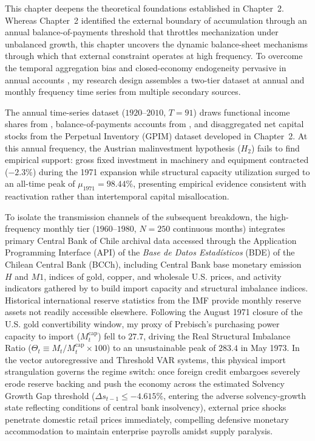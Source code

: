 This chapter deepens the theoretical foundations established in Chapter~2. Whereas Chapter~2 identified the external boundary of accumulation through an annual balance-of-payments threshold that throttles mechanization under unbalanced growth, this chapter uncovers the dynamic balance-sheet mechanisms through which that external constraint operates at high frequency. To overcome the temporal aggregation bias and closed-economy endogeneity pervasive in annual accounts \citep{DornbuschEdwards1990,Edwards2024}, my research design assembles a two-tier dataset at annual and monthly frequency time series from multiple secondary sources.  

The annual time-series dataset ($1920$--$2010$, $T=91$) draws functional income shares from \citet{Astorga2023}, balance-of-payments accounts from \citet{NievasPiketty2025}, and disaggregated net capital stocks from the Perpetual Inventory (GPIM) dataset developed in Chapter~2. At this annual frequency, the Austrian malinvestment hypothesis ($H_2$) fails to find empirical support: gross fixed investment in machinery and equipment contracted ($-2.3\%$) during the 1971 expansion while structural capacity utilization surged to an all-time peak of $\mu_{1971} = 98.44\%$, presenting empirical evidence consistent with reactivation rather than intertemporal capital misallocation. 

To isolate the transmission channels of the subsequent breakdown, the high-frequency monthly tier ($1960$--$1980$, $N=250$ continuous months) integrates primary Central Bank of Chile archival data accessed through the Application Programming Interface (API) of the \textit{Base de Datos Estadísticos} (BDE) of the Chilean Central Bank (BCCh), including Central Bank base monetary emission $H$ and $M1$, indices of gold, copper, and wholesale U.S. prices, and activity indicators gathered by \citet{DiazBahamonde2023} to build import capacity and structural imbalance indices. Historical international reserve statistics from the IMF provide monthly reserve assets not readily accessible elsewhere. Following the August 1971 closure of the U.S. gold convertibility window, my proxy of Prebisch's purchasing power capacity to import ($M^{\text{cap}}_t$) fell to $27.7$, driving the Real Structural Imbalance Ratio ($\Theta_t \equiv M_t / M^{\text{cap}}_t \times 100$) to an unsustainable peak of $283.4$ in May 1973. In the vector autoregressive and Threshold VAR systems, this physical import strangulation governs the regime switch: once foreign credit embargoes \citep{DeVylder1976,PetrasMorley1975} severely erode reserve backing and push the economy across the estimated Solvency Growth Gap threshold ($\Delta s_{t-1} \le -4.615\%$, entering the adverse solvency-growth state reflecting conditions of central bank insolvency), external price shocks penetrate domestic retail prices immediately, compelling defensive monetary accommodation to maintain enterprise payrolls amidst supply paralysis.

